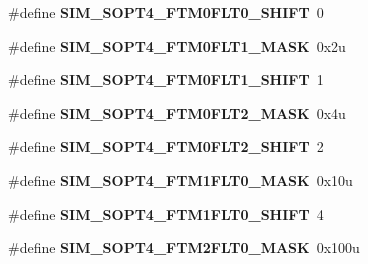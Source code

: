 \begin{DoxyCompactItemize}
\item 
\#define {\bfseries S\+I\+M\+\_\+\+S\+O\+P\+T4\+\_\+\+F\+T\+M0\+F\+L\+T0\+\_\+\+S\+H\+I\+FT}~0\hypertarget{group__SIM__Register__Masks_gafc9e6a78afb92b0ff8189d6bc30c39ce}{}\label{group__SIM__Register__Masks_gafc9e6a78afb92b0ff8189d6bc30c39ce}

\item 
\#define {\bfseries S\+I\+M\+\_\+\+S\+O\+P\+T4\+\_\+\+F\+T\+M0\+F\+L\+T1\+\_\+\+M\+A\+SK}~0x2u\hypertarget{group__SIM__Register__Masks_gaa42586e5889050292d5e70bf2d1aea2d}{}\label{group__SIM__Register__Masks_gaa42586e5889050292d5e70bf2d1aea2d}

\item 
\#define {\bfseries S\+I\+M\+\_\+\+S\+O\+P\+T4\+\_\+\+F\+T\+M0\+F\+L\+T1\+\_\+\+S\+H\+I\+FT}~1\hypertarget{group__SIM__Register__Masks_gaf503fb0314431593f41ebe5fa4b83851}{}\label{group__SIM__Register__Masks_gaf503fb0314431593f41ebe5fa4b83851}

\item 
\#define {\bfseries S\+I\+M\+\_\+\+S\+O\+P\+T4\+\_\+\+F\+T\+M0\+F\+L\+T2\+\_\+\+M\+A\+SK}~0x4u\hypertarget{group__SIM__Register__Masks_gafa0c4deac7488857fd22e28602b612fb}{}\label{group__SIM__Register__Masks_gafa0c4deac7488857fd22e28602b612fb}

\item 
\#define {\bfseries S\+I\+M\+\_\+\+S\+O\+P\+T4\+\_\+\+F\+T\+M0\+F\+L\+T2\+\_\+\+S\+H\+I\+FT}~2\hypertarget{group__SIM__Register__Masks_gacca0c622cfa1e0c7e7214096c38c6557}{}\label{group__SIM__Register__Masks_gacca0c622cfa1e0c7e7214096c38c6557}

\item 
\#define {\bfseries S\+I\+M\+\_\+\+S\+O\+P\+T4\+\_\+\+F\+T\+M1\+F\+L\+T0\+\_\+\+M\+A\+SK}~0x10u\hypertarget{group__SIM__Register__Masks_ga605f729e3f4faddc18e957c077adf61a}{}\label{group__SIM__Register__Masks_ga605f729e3f4faddc18e957c077adf61a}

\item 
\#define {\bfseries S\+I\+M\+\_\+\+S\+O\+P\+T4\+\_\+\+F\+T\+M1\+F\+L\+T0\+\_\+\+S\+H\+I\+FT}~4\hypertarget{group__SIM__Register__Masks_ga9fb8861affd661f64719260a43a87ec6}{}\label{group__SIM__Register__Masks_ga9fb8861affd661f64719260a43a87ec6}

\item 
\#define {\bfseries S\+I\+M\+\_\+\+S\+O\+P\+T4\+\_\+\+F\+T\+M2\+F\+L\+T0\+\_\+\+M\+A\+SK}~0x100u\hypertarget{group__SIM__Register__Masks_ga4f61f56a63a5d239be393708c17cf82c}{}\label{group__SIM__Register__Masks_ga4f61f56a63a5d239be393708c17cf82c}


\end{DoxyCompactItemize}
